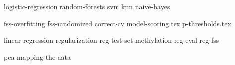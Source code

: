 \documentclass[symmetric, justified, a4paper, nofonts]{tufte-book}
\begin{document}

{logistic-regression}
{random-forests}
{svm}
{knn}
{naive-bayes}

{fss-overfitting}
{fss-randomized}
{correct-cv}
{model-scoring.tex}
{p-thresholds.tex}

{linear-regression}
{regularization}
{reg-test-set}
{methylation}
{reg-eval}
{reg-fss}


{pca}
{mapping-the-data}

\backmatter
\nocite{*}





\printindex
\end{document}
